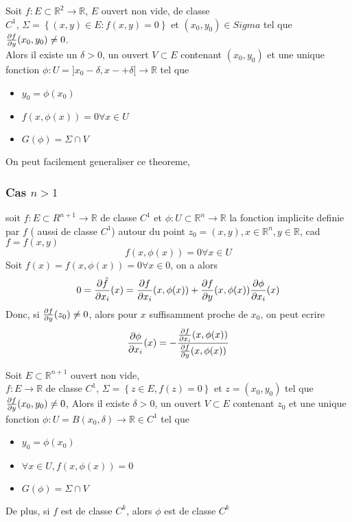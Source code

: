 \documentclass[../main.tex]{subfiles}
\begin{document}
\begin{thm}
	Soit $f: E \subset \mathbb{R}^{2} \to \mathbb{R}$, $E$ ouvert non vide, de classe\\
	$C^{1}$, $\Sigma = \left\{ ( x,y) \in E: f( x,y) = 0 \right\} $ et $( x_0,y_0) \in Sigma$ tel que $ \frac{\partial f}{\partial y}( x_0,y_0) \neq 0$.\\
	Alors il existe un $\delta >0$, un ouvert $V \subset E$ contenant $( x_0,y_0) $ et une unique fonction $\phi: U = ]x_0- \delta,x-+ \delta[\to \mathbb{R}$ tel que
	\begin{itemize}
		\item $y_0 = \phi( x_0) $ 
		\item $f( x,\phi( x) ) = 0 \forall x \in U$
		\item $G( \phi) = \Sigma \cap V$
	\end{itemize}
	
\end{thm}
On peut facilement generaliser ce theoreme,
\subsubsection{Cas $n>1$}
soit $f: E \subset R^{n+1}\to \mathbb{R}$ de classe $C^{1}$ et $\phi: U \subset \mathbb{R}^n\to \mathbb{R}$ la fonction implicite definie par $f$ ( aussi de classe $C^{1}$) autour du point $z_0 = ( x,y) , x \in \mathbb{R}^n, y \in \mathbb{R}$, cad $f= f( x,y) $ 
\[ 
	f( x, \phi( x) ) = 0 \forall x \in U
\]
Soit $f( x) = f( x,\phi( x) ) = 0 \forall x \in 0$, on a alors
\begin{align*}
	0 = \frac{\partial \tilde f}{\partial x_i}( x) = \frac{\partial f}{\partial x_i }( x,\phi( x) ) + \frac{\partial f}{\partial y}( x,\phi( x) ) \frac{\partial \phi}{\partial x_i}( x)  
\end{align*}
Donc, si $ \frac{\partial f}{\partial y}( z_0) \neq 0$, alors pour $x$ suffisamment proche de $x_0$, on peut ecrire
\[ 
	\frac{\partial \phi}{\partial x_i}( x) =   - \frac{ \frac{\partial f}{\partial x_i}( x,\phi( x) ) }{\frac{\partial f}{\partial y}( x,\phi( x) ) }
\]
\begin{thm}
	Soit $E \subset \mathbb{R}^{n+1}$ ouvert non vide,\\ $f: E \to \mathbb{R}$ de classe $C^{1}$, $\Sigma = \left\{ z \in E, f(  z) =0 \right\} $ et $z = ( x_0,y_0) $ tel que $ \frac{\partial f}{\partial y}( x_0,y_0) \neq 0$, Alors il existe $\delta >0$, un ouvert $V \subset E$ contenant $z_0$ et une unique fonction $\phi: U = B( x_0,\delta) \to \mathbb{R} \in C^{1}$ tel que
	\begin{itemize}
		\item $y_0= \phi( x_0) $ 
		\item $\forall x \in U, f( x,\phi( x) ) =0$ 
		\item $G( \phi) = \Sigma \cap V$
	\end{itemize}
	De plus, si $f$ est de classe $C^{k}$, alors $\phi$ est de classe $C^{k}$
\end{thm}
			
\end{document}
